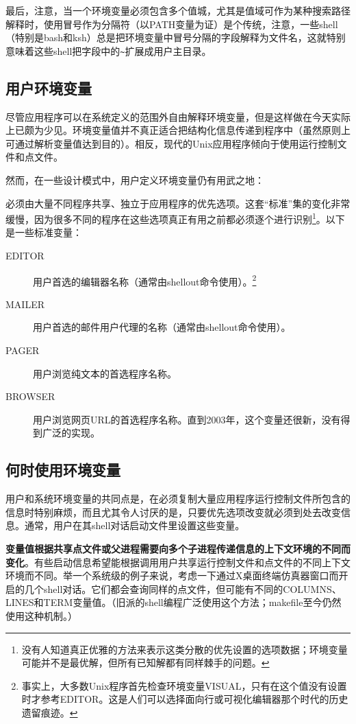 \documentclass[12pt,oneside]{book}
\begin{document}
\begin{common-format}
最后，注意，当一个环境变量必须包含多个值城，尤其是值域可作为某种搜索路径解释时，使用冒号作为分隔符（以PATH变量为证）是个传统，注意，一些shell（特别是bash和ksh）总是把环境变量中冒号分隔的字段解释为文件名，这就特别意味着这些shell把字段中的\verb+~+扩展成用户主目录。

\subsection{用户环境变量}
尽管应用程序可以在系统定义的范围外自由解释环境变量，但是这样做在今天实际上已颇为少见。环境变量值并不真正适合把结构化信息传递到程序中（虽然原则上可通过解析变量值达到目的）。相反，现代的Unix应用程序倾向于使用运行控制文件和点文件。

然而，在一些设计模式中，用户定义环境变量仍有用武之地：

必须由大量不同程序共享、独立于应用程序的优先选项。这套“标准”集的变化非常缓慢，因为很多不同的程序在这些选项真正有用之前都必须逐个进行识别\footnote{没有人知道真正优雅的方法来表示这类分散的优先设置的选项数据；环境变量可能并不是最优解，但所有已知解都有同样棘手的问题。}。以下是一些标准变量：
\begin{description}
\item[EDITOR] 用户首选的编辑器名称（通常由shellout命令使用）。\footnote{事实上，大多数Unix程序首先检查环境变量VISUAL，只有在这个值没有设置时才参考EDITOR。这是人们可以选择面向行或可视化编辑器那个时代的历史遗留痕迹。}
\item[MAILER] 用户首选的邮件用户代理的名称（通常由shellout命令使用）。
\item[PAGER] 用户浏览纯文本的首选程序名称。
\item[BROWSER] 用户浏览网页URL的首选程序名称。直到2003年，这个变量还很新，没有得到广泛的实现。
\end{description}


\subsection{何时使用环境变量}
用户和系统环境变量的共同点是，在必须复制大量应用程序运行控制文件所包含的信息时特别麻烦，而且尤其令人讨厌的是，只要优先选项改变就必须到处去改变信息。通常，用户在其shell对话启动文件里设置这些变量。

\textbf{变量值根据共享点文件或父进程需要向多个子进程传递信息的上下文环境的不同而变化}。有些启动信息希望能根据调用用户共享运行控制文件和点文件的不同上下文环境而不同。举一个系统级的例子来说，考虑一下通过X桌面终端仿真器窗口而开启的几个shell对话。它们都会查询同样的点文件，但可能有不同的COLUMNS、LINES和TERM变量值。（旧派的shell编程广泛使用这个方法；makefile至今仍然使用这种机制。）


\end{common-format}
\end{document}
